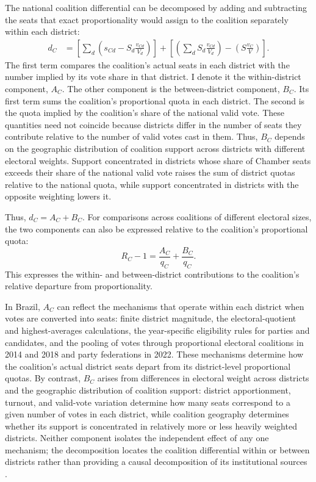 \documentclass[11pt]{article}
\begin{document}
The national coalition differential can be decomposed by adding and subtracting
the seats that exact proportionality would assign to the coalition separately
within each district:
\[
\begin{aligned}
d_C
&=
\left[
\sum_d
\left(
s_{Cd}-S_d\frac{v_{Cd}}{V_d}
\right)
\right]
+
\left[
\left(
\sum_d S_d\frac{v_{Cd}}{V_d}
\right)
-
\left(
S\frac{v_C}{V}
\right)
\right].
\end{aligned}
\]
The first term compares the coalition's actual seats in each district with the
number implied by its vote share in that district. I denote it the
within-district component, \(A_C\). The other component is the between-district
component, \(B_C\). Its first term sums the coalition's proportional quota in
each district. The second is the quota implied by the coalition's share of the
national valid vote. These quantities need not coincide because districts differ
in the number of seats they contribute relative to the number of valid votes
cast in them. Thus, \(B_C\) depends on the geographic distribution of coalition
support across districts with different electoral weights. Support concentrated
in districts whose share of Chamber seats exceeds their share of the national
valid vote raises the sum of district quotas relative to the national quota,
while support concentrated in districts with the opposite weighting lowers it.

Thus, \(d_C=A_C+B_C\).
For comparisons across coalitions of different electoral sizes, the two
components can also be expressed relative to the coalition's proportional quota:
\[
R_C-1=\frac{A_C}{q_C}+\frac{B_C}{q_C}.
\]
This expresses the within- and between-district contributions to the coalition's
relative departure from proportionality.

In Brazil, \(A_C\) can reflect the mechanisms that
operate within each district when votes are converted into seats: finite district
magnitude, the electoral-quotient and highest-averages calculations, the
year-specific eligibility rules for parties and candidates, and the pooling of
votes through proportional electoral coalitions in 2014 and 2018 and party
federations in 2022. These mechanisms determine how the coalition's actual
district seats depart from its district-level proportional quotas. By contrast,
\(B_C\) arises from differences in electoral weight across districts and the
geographic distribution of coalition support: district apportionment, turnout,
and valid-vote variation determine how many seats correspond to a given number
of votes in each district, while coalition geography determines whether its
support is concentrated in relatively more or less heavily weighted districts.
Neither component isolates the independent effect of any one mechanism; the
decomposition locates the coalition differential within or between districts
rather than providing a causal decomposition of its institutional sources
\parencite{bochsler2026winners}.
\end{document}
